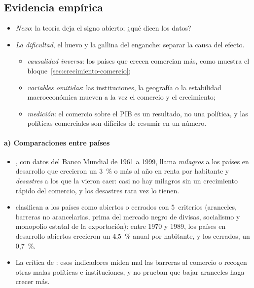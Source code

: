 \documentclass[11pt]{article}
\begin{document}
\subsection{Evidencia empírica}\label{sec:evidencia}

\begin{itemize}
\item \emph{Nexo}: la teoría deja el signo abierto; ¿qué dicen los datos?
\item \emph{La dificultad}, el huevo y la gallina del enganche: separar la causa del efecto.
  \begin{itemize}
  \item \emph{causalidad inversa}: los países que crecen comercian más, como muestra el bloque~\ref{sec:crecimiento-comercio};
  \item \emph{variables omitidas}: las instituciones, la geografía o la estabilidad macroeconómica mueven a la vez el comercio y el crecimiento;
  \item \emph{medición}: el comercio sobre el PIB es un resultado, no una política, y las políticas comerciales son difíciles de resumir en un número.
  \end{itemize}
\end{itemize}

\paragraph{a) Comparaciones entre países}

\begin{itemize}
\item \textcite{Panagariya2004Miracles}, con datos del Banco Mundial de 1961 a 1999, llama \emph{milagros} a los países en desarrollo que crecieron un 3~\% o más al año en renta por habitante y \emph{desastres} a los que la vieron caer: casi no hay milagros sin un crecimiento rápido del comercio, y los desastres rara vez lo tienen.
\item \textcite{SachsWarner1995Economic} clasifican a los países como abiertos o cerrados con 5~criterios (aranceles, barreras no arancelarias, prima del mercado negro de divisas, socialismo y monopolio estatal de la exportación): entre 1970 y 1989, los países en desarrollo abiertos crecieron un 4,5~\% anual por habitante, y los cerrados, un 0,7~\%.
\item La crítica de \textcite{RodriguezRodrik2000Trade}: esos indicadores miden mal las barreras al comercio o recogen otras malas políticas e instituciones, y no prueban que bajar aranceles haga crecer más.
\end{itemize}
\end{document}
